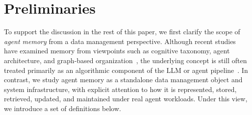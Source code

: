 \documentclass{llmxive}
\begin{document}





\section{Preliminaries}
\label{sec:def}

To support the discussion in the rest of this paper, we first clarify the scope of \emph{agent memory} from a data management perspective. Although recent studies have examined memory from viewpoints such as cognitive taxonomy, agent architecture, and graph-based organization~\cite{zhang2024survey,du2026memory,hu2025memory,wu2026memoryeab,tang2026survey,yang2026graph}, the underlying concept is still often treated primarily as an algorithmic component of the LLM or agent pipeline~\cite{zhang2024survey,du2026memory,hu2025memory}. In contrast, we study agent memory as a standalone data management object and system infrastructure, with explicit attention to how it is represented, stored, retrieved, updated, and maintained under real agent workloads. Under this view, we introduce a set of definitions below.
\end{document}
